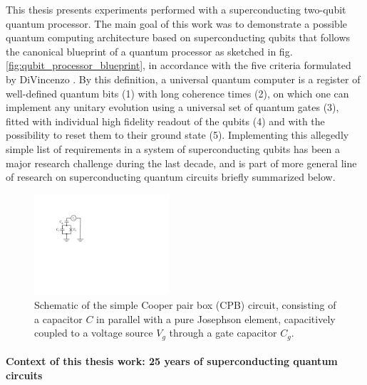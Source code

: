 This thesis presents experiments performed with a superconducting
two-qubit quantum processor. The main goal of this work was to demonstrate
a possible quantum computing architecture based on superconducting
qubits that follows the canonical blueprint of a quantum processor
as sketched in fig. \ref{fig:qubit_processor_blueprint},
in accordance with the five criteria formulated by DiVincenzo \citep{divincenzo_physical_2000}.
By this definition, a universal quantum computer is a register of
well-defined quantum bits (1) with long coherence times (2),
on which one can implement any unitary evolution using a universal
set of quantum gates (3), fitted with individual high fidelity readout
of the qubits (4) and with the possibility to reset them to their ground state (5). Implementing this allegedly simple list of requirements
in a system of superconducting qubits has been a major research challenge
during the last decade, and is part of more general line of research
on superconducting quantum circuits briefly summarized below.

%
\begin{figure}
 \centering \includegraphics[width=5cm]{./material/figures/introduction/cooper_pair_box_simple}
\caption[]{Schematic of the simple Cooper pair box (CPB) circuit, consisting
of a capacitor $C$ in parallel with a pure Josephson element, capacitively
coupled to a voltage source $V_g$ through a gate capacitor $C_g$.}
\label{fig:cooper_pair_box_simple} %
\end{figure}



\paragraph{Context of this thesis work: 25 years of superconducting
quantum circuits}

